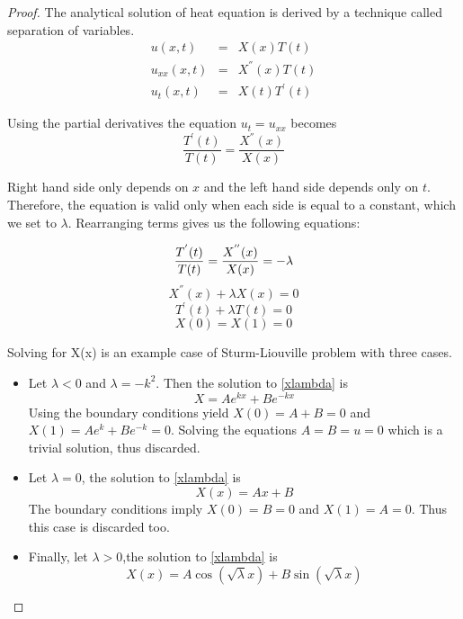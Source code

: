 \documentclass[12pt, oneside]{book}
\theoremstyle{plain}
\theoremstyle{definition}
\begin{document}
\begin{proof}
 The analytical solution of heat equation  is derived by a technique called separation of variables. 
\begin{eqnarray}
u(x,t) &=& X(x) T(t) \\[10pt]
u_{xx}(x, t) &=& X^{''}(x) T(t) \\[10pt]
u_t (x,t) &=& X(t) T^{'}(t)
\end{eqnarray}


Using the partial derivatives the equation $ u_t = u_{xx} $ becomes
\begin{equation}
\frac{T^{'}(t)}{T(t)} = \frac{X^{''}(x)}{X(x)}
\end{equation}

Right hand side only depends on $x$ and the left hand side depends only on $t$. Therefore, the equation is valid only when each side is equal to a constant, which we set to $ \lambda $. Rearranging terms gives us the following equations:

\begin{equation}
\frac{T^{'}(t)}{T(t)} = \frac{X^{''}(x)}{X(x)} = -\lambda \\[10pt]
\end{equation}
\begin{equation}\label{xlambda}
X^{''}(x)  + \lambda X(x) = 0 
\end{equation}
\begin{equation}\label{tlambda}
T^{'}(t) + \lambda T(t) = 0
\end{equation}
\begin{equation}
X(0) = X(1) = 0
\end{equation}

Solving for X(x) is an example case of Sturm-Liouville problem \cite{sepvar} with three cases. 
\begin{itemize}
\item Let $\lambda < 0$ and $\lambda = -k^2$. Then the solution to \ref{xlambda} is
$$ X = Ae^{kx} + Be^{-kx} $$
Using the boundary conditions yield $X(0) = A + B = 0 $ and $X(1) = Ae^{k} + Be^{-k} = 0$. Solving the equations $A=B=u=0$ which is a trivial solution, thus discarded.
\item Let $\lambda = 0$, the solution to \ref{xlambda} is
$$ X(x) = Ax + B $$
The boundary conditions imply $X(0) = B = 0$ and $X(1) = A= 0$. Thus this case is  discarded too.
\item Finally, let $\lambda>0$,the solution to \ref{xlambda} is
$$ X(x) = A \cos(\sqrt{\lambda}x) + B \sin(\sqrt{\lambda}x) $$


\end{itemize}
\end{proof}
\end{document}
